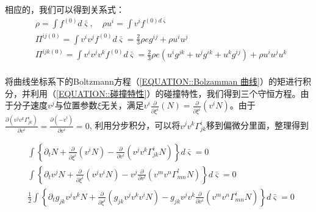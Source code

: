 \documentclass[MathematicsNumericsDerivationsAndOpenFOAM.tex]{subfiles}
\begin{document}
相应的，我们可以得到关系式：
\begin{equation}
  \begin{aligned}
     & \rho=\int f^{(0)} d \bar{\varsigma}, \quad \rho u^{i}=\int  v^{i} f^{(0) d \bar{\varsigma}}                                                       \\
     & \Pi^{i j (0)}=\int  v^{i} v^{j} f^{(0)}d \bar{\varsigma}= \frac{2}{3}\rho e g^{i j}+\rho u^{i} u^{j}                                              \\
     & \Pi^{i j k (0)}=\int  v^{i} v^{j} v^{k}  f^{(0)} d \bar{\varsigma}= \frac{2}{3}\rho e (u^i g^{jk}+u^j g^{ik} + u^k g^{ij})+\rho u^{i} u^{j} u^{k} \\
  \end{aligned}
  \label{EQUATION::A.20} ~
\end{equation}
%


%

将曲线坐标系下的Boltzmann方程（\ref{EQUATION::Bolzamman 曲线}）的矩进行积分，并利用（\ref{EQUATION::碰撞特性}）的碰撞特性，我们得到三个守恒方程。由于分子速度$v^j$与位置参数$\xi$无关，满足$v^i \frac{\partial}{\partial \xi^i}(N)=\frac{\partial}{\partial \xi^i}(v^i N)$。由于$\frac{\partial (v^j v^k \Gamma_{jk}^i)}{\partial v^i}=\frac{\partial(-\dot{v}^i)}{\partial v^i}=0$, 利用分步积分，可以将$v^j v^k \Gamma_{jk}^i$移到偏微分里面，整理得到

%
%
\begin{equation}
  \begin{aligned}
     & \int  \left\{\partial_{t} N+\frac{\partial}{\partial \xi^{i}}\left(v^{i} N\right)-\frac{\partial}{\partial v^{i}}\left( v^{j} v^{k} \Gamma_{j k}^{i} N\right)\right\}d\bar{\varsigma}=0                                                                     \\
     & \int \left\{\partial_{t}  v^{j} N+\frac{\partial}{\partial \xi^{i}}\left( v^{j} v^{i} N\right)-v^{j}\frac{\partial}{\partial v^{l}}\left(  v^{m} v^{n} \Gamma_{mn}^{l} N\right)\right\}d \bar{\varsigma}=0                                                  \\
     & \frac{1}{2}\int \left\{\partial_{t} g_{jk} v^{j}v^{k} N+ \frac{\partial}{\partial \xi^{i}}\left( g_{jk}v^{j} v^{k} v^{i} N\right)- g_{jk} v^{j}v^{k}  \frac{\partial}{\partial v^{i}}\left( v^{m} v^{n} \Gamma_{mn}^{i} N\right)\right\}d \bar{\varsigma}=0 \\
  \end{aligned}
  \label{EQUATION::A.12} ~
\end{equation}
%
%
\end{document}
